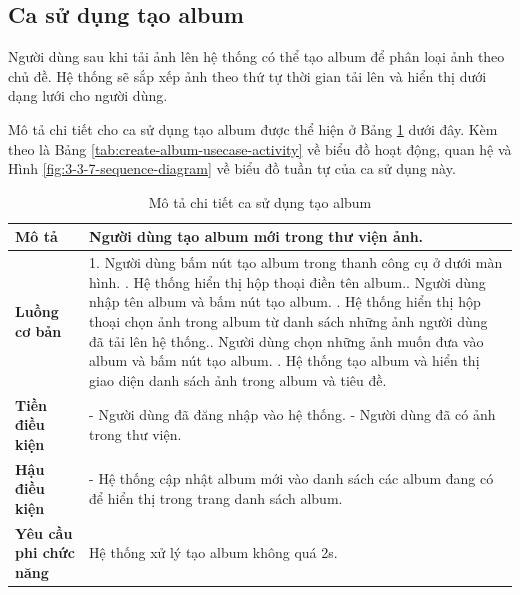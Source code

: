 \subsection{Ca sử dụng tạo album}

Người dùng sau khi tải ảnh lên hệ thống có thể tạo album để phân loại ảnh theo chủ đề. Hệ thống sẽ sắp xếp ảnh theo thứ tự thời gian tải lên và hiển thị dưới dạng lưới cho người dùng.

Mô tả chi tiết cho ca sử dụng tạo album được thể hiện ở Bảng \ref{tab:create-album-usecase} dưới đây. Kèm theo là Bảng \ref{tab:create-album-usecase-activity} về biểu đồ hoạt động, quan hệ và Hình \ref{fig:3-3-7-sequence-diagram} về biểu đồ tuần tự của ca sử dụng này. 

\noindent 

\begin{table}[H]
\centering
\caption{Mô tả chi tiết ca sử dụng tạo album}
\label{tab:create-album-usecase}
\begin{tabularx}{\linewidth}{| l | X |} 
\hline 
\textbf{Mô tả} & Người dùng tạo album mới trong thư viện ảnh. \\
\hline 
\textbf{Luồng cơ bản} & 1. Người dùng bấm nút tạo album trong thanh công cụ ở dưới màn hình. \newline
                       2. Hệ thống hiển thị hộp thoại điền tên album.\newline
                       3. Người dùng nhập tên album và bấm nút tạo album. \newline
                       4. Hệ thống hiển thị hộp thoại chọn ảnh trong album từ danh sách những ảnh người dùng đã tải lên hệ thống.\newline
                       5. Người dùng chọn những ảnh muốn đưa vào album và bấm nút tạo album. \newline
                       6. Hệ thống tạo album và hiển thị giao diện danh sách ảnh trong album và tiêu đề. \\
\hline 
\textbf{Tiền điều kiện} & - Người dùng đã đăng nhập vào hệ thống. \newline
                           - Người dùng đã có ảnh trong thư viện. \\
\hline
\textbf{Hậu điều kiện} & - Hệ thống cập nhật album mới vào danh sách các album đang có để hiển thị trong trang danh sách album. \\
\hline 
\textbf{Yêu cầu phi chức năng} & Hệ thống xử lý tạo album không quá 2s. \\
\hline 
\end{tabularx}
\end{table}

